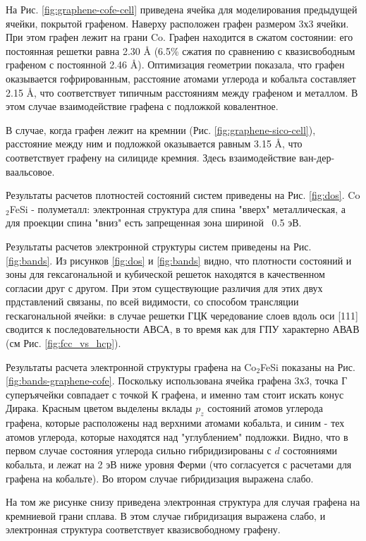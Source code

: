 \documentclass[]{article}
\begin{document}
На Рис. \ref{fig:graphene-cofe-cell} приведена ячейка для моделирования предыдущей ячейки, покрытой графеном. Наверху расположен графен размером 3х3 ячейки. При этом графен лежит на грани Co. Графен находится в сжатом состоянии: его постоянная решетки равна 2.30 Å (6.5\% сжатия по сравнению с квазисвободным графеном с постоянной 2.46 Å). Оптимизация геометрии показала, что графен оказывается гофрированным, расстояние атомами углерода и кобальта составляет 2.15 Å, что соответствует типичным расстояниям между графеном и металлом. В этом случае взаимодействие графена с подложкой ковалентное.

В случае, когда графен лежит на кремнии (Рис. \ref{fig:graphene-sico-cell}), расстояние между ним и подложкой оказывается равным 3.15 Å, что соответствует графену на силициде кремния. Здесь взаимодействие ван-дер-ваальсовое.



Результаты расчетов плотностей состояний систем приведены на Рис. \ref{fig:dos}. Co$_2$FeSi - полуметалл: электронная структура для спина "вверх" металлическая, а для проекции спина "вниз" есть запрещенная зона шириной ~0.5 эВ. 

Результаты расчетов электронной структуры систем приведены на Рис. \ref{fig:bands}. Из рисунков \ref{fig:dos} и \ref{fig:bands} видно, что плотности состояний и зоны для гексагональной и кубической решеток находятся в качественном согласии друг с другом. При этом существующие различия для этих двух прдставлений связаны, по всей видимости, со способом трансляции гескагональной ячейки: в случае  решетки ГЦК чередование слоев вдоль оси [111] сводится к последовательности АВСА, в то время как для ГПУ характерно АВАВ (см Рис. \ref{fig:fcc_vs_hcp}). 

Результаты расчета электронной структуры графена на Co$_2$FeSi показаны на Рис. \ref{fig:bands-graphene-cofe}. Поскольку использована ячейка графена 3х3, точка Г суперъячейки совпадает с точкой К графена, и именно там стоит искать конус Дирака. Красным цветом выделены вклады $p_z$ состояний атомов углерода графена, которые расположены над верхними атомами кобальта, и синим - тех атомов углерода, которые находятся над "углублением" подложки. Видно, что в первом случае состояния углерода сильно гибридизированы с $d$ состояниями кобальта, и лежат на 2 эВ ниже уровня Ферми (что согласуется с расчетами для графена на кобальте). Во втором случае гибридизация выражена слабо. 

На том же рисунке снизу приведена электронная структура для случая графена на кремниевой грани сплава. В этом случае гибридизация выражена слабо, и электронная структура соответствует квазисвободному графену.
\end{document}
